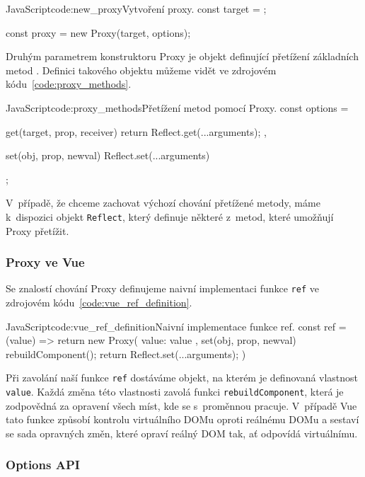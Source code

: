 \documentclass[
  master,
  program=ainf,
  tables=false,
  sourcecodes,
  glossaries,
  index
]{kidiplom}
\begin{document}
\begin{kicode}{JavaScript}{code:new_proxy}{Vytvoření proxy.}
  const target = {};

  const proxy = new Proxy(target, options);
\end{kicode}

Druhým parametrem konstruktoru Proxy je objekt definující přetížení základních metod \cite{default_methods}. 
Definici takového objektu můžeme vidět ve zdrojovém kódu~\ref{code:proxy_methods}.

\begin{kicode}{JavaScript}{code:proxy_methods}{Přetížení metod pomocí Proxy.}
  const options = {
    get(target, prop, receiver) {
      return Reflect.get(...arguments);
    },

    set(obj, prop, newval) {
      Reflect.set(...arguments)
    }
  };
\end{kicode}

V~případě, že chceme zachovat výchozí chování přetížené metody, máme k~dispozici objekt
{\tt Reflect}, který definuje některé z~metod, které umožňují Proxy přetížit.


\subsubsection{Proxy ve Vue}

Se znalostí chování Proxy definujeme naivní implementaci funkce {\tt ref} ve zdrojovém kódu~\ref{code:vue_ref_definition}. 

\begin{kicode}{JavaScript}{code:vue_ref_definition}{Naivní implementace funkce ref.}
  const ref = (value) => {
    return new Proxy({ value: value }, {
      set(obj, prop, newval) {
        rebuildComponent();
        return Reflect.set(...arguments);
      }
    })
  }
\end{kicode}

Při zavolání naší funkce {\tt ref} dostáváme objekt, na kterém je definovaná vlastnost {\tt value}. 
Každá změna této vlastnosti zavolá funkci {\tt rebuildComponent}, která je zodpovědná za
opravení všech míst, kde se s~proměnnou pracuje. V~případě Vue \cite{vue} tato funkce způsobí
kontrolu virtuálního DOMu oproti reálnému DOMu a sestaví se sada opravných změn, které
opraví reálný DOM tak, ať odpovídá virtuálnímu.

\subsubsection{Options API}
\end{document}
